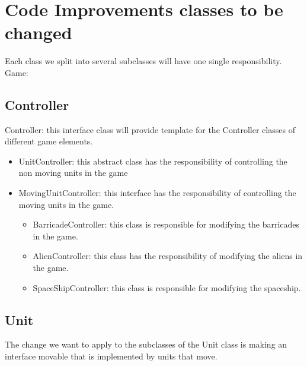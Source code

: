 \section*{Code Improvements classes to be changed}
Each class we split into several subclasses will have one single responsibility. \\
Game:
\subsection*{Controller}
Controller: this interface class will provide template for the Controller classes of different game elements. 
	\begin{itemize}
	\item UnitController: this abstract class has the responsibility of controlling the non moving units in the game
	\item MovingUnitController: this interface has the responsibility of controlling the moving units in the game. 
		\begin{itemize}
			\item BarricadeController: this class is responsible for modifying the 	barricades in the game.
			\item AlienController: this class has the responsibility of modifying the aliens in the game.
			\item SpaceShipController: this class is responsible for modifying the spaceship.
		\end{itemize}
	\end{itemize}
\subsection*{Unit}
The change we want to apply to the subclasses of the Unit class is making an interface movable that is implemented by units that move.
